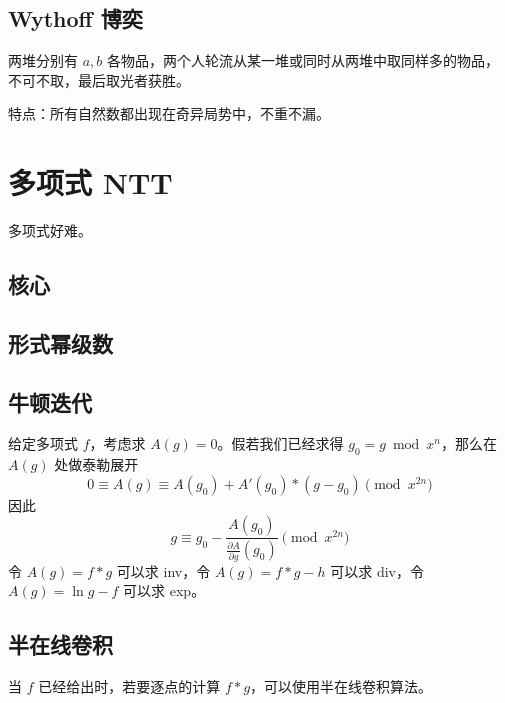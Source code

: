 \documentclass{probook}
\begin{document}
\begin{multicols}{2}
\subsection{Wythoff 博奕}

两堆分别有 $a,b$ 各物品，两个人轮流从某一堆或同时从两堆中取同样多的物品，不可不取，最后取光者获胜。



特点：所有自然数都出现在奇异局势中，不重不漏。

\section{多项式 NTT}

多项式好难。

\subsection{核心}



\subsection{形式幂级数}



\subsection{牛顿迭代}

给定多项式 $f$，考虑求 $A(g) = 0$。假若我们已经求得 $g_0 = g \bmod x^n$，那么在 $A(g)$ 处做泰勒展开
\[ 0 \equiv A(g) \equiv A(g_0) + A'(g_0) \ast (g - g_0) \pmod{x^{2n}} \]
因此
\[ g \equiv g_0 - \frac{A(g_0)}{\frac{\partial A}{\partial g}(g_0)} \pmod{x^{2n}} \]
令 $A(g) = f \ast g$ 可以求 inv，令 $A(g) = f \ast g - h$ 可以求 div，令 $A(g) = \ln g - f$ 可以求 exp。



\subsection{半在线卷积}

当 $f$ 已经给出时，若要逐点的计算 $f \ast g$，可以使用半在线卷积算法。


\end{multicols}
\end{document}
